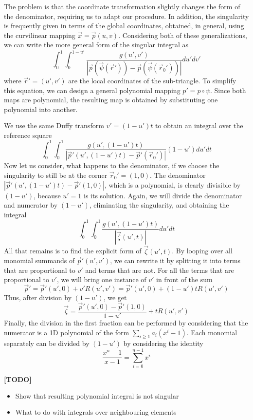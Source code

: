 \noindent
The problem is that the coordinate transformation slightly changes the form of the denominator, requiring us to adapt our procedure. In addition, the singularity is frequently given
in terms of the global coordinates, obtained, in general, using the curvilinear mapping $\vec{x} = \vec{p}(u, v)$. Considering both of these generalizations, we can write the more general
form of the singular integral as 
\[ \int_0^1 \int_0^{1-u'} \frac{g(u',v')}{|\vec{p}(\vec{\psi}(\vec{r}')) - \vec{p}(\vec{\psi}(\vec{r}_0'))|} du' dv' \]
where $\vec{r}' = (u', v')$ are the local coordinates of the sub-triangle. To simplify this equation, we can design a general polynomial mapping $p' = p \circ \psi$.
Since both maps are polynomial, the resulting map is obtained by substituting one polynomial into another.

\noindent
We use the same Duffy transform $v' = (1-u')t$ to obtain an integral over the reference square
\[ \int_0^1 \int_0^1 \frac{g(u',(1-u')t)}{|\vec{p}'(u',(1-u')t) - \vec{p}'(\vec{r}_0')|} (1-u')du' dt \]
Now let us consider, what happens to the denominator, if we choose the singularity to still be at the corner $\vec{r}_0' = (1,0)$.
The denominator $|\vec{p}'(u',(1-u')t) - \vec{p}'(1,0)|$, which is a polynomial, is clearly divisible by $(1-u')$, because $u' = 1$ is its solution. Again, we will divide the denominator
and numerator by $(1-u')$, eliminating the singularity, and obtaining the integral
\[ \int_0^1 \int_0^1 \frac{g(u',(1-u')t)}{|\vec{\zeta}(u', t)|} du' dt \]
All that remains is to find the explicit form of $\vec{\zeta}(u', t)$. By looping over all monomial summands of $\vec{p}'(u',v')$, we can rewrite it by splitting it into terms that
are proportional to $v'$ and terms that are not. For all the terms that are proportional to $v'$, we will bring one instance of $v'$ in front of the sum
\[ \vec{p}' = \vec{p}'(u', 0) + v' R(u', v') = \vec{p}'(u', 0) + (1-u')t R(u', v') \]
Thus, after division by $(1-u')$, we get
\[ \vec{\zeta} = \frac{\vec{p}'(u', 0) - \vec{p}'(1, 0)}{1-u'} + t R(u', v') \]
Finally, the division in the first fraction can be performed by considering that the numerator is a 1D polynomial of the form $\sum_{i \geq 1} a_i (x^i - 1)$.
Each monomial separately can be divided by $(1-u')$ by considering the identity
\[ \frac{x^n - 1}{x - 1} = \sum_{i=0}^{n-1} x^i \]


\textbf{[TODO]}
\begin{itemize}
  \item Show that resulting polynomial integral is not singular
  \item What to do with integrals over neighbouring elements
\end{itemize}






